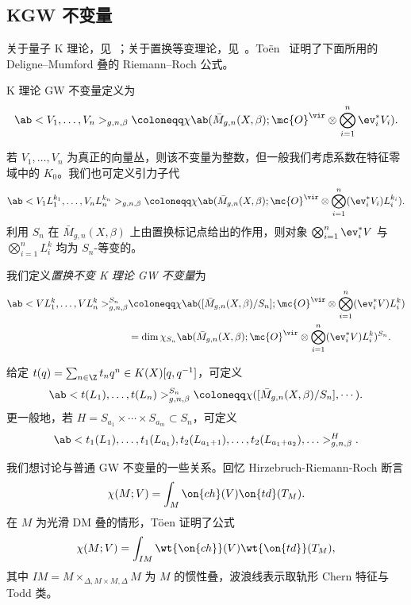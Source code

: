 \subsection{KGW 不变量}%
\label{sub:KGW invariants}

关于量子 K 理论，见~\cite{Lee2004}；关于置换等变理论，见~\cite{Givental2017K1,GiventalK7}。To\"en~\cite{Toen1999} 证明了下面所用的 Deligne--Mumford 叠的 Riemann--Roch 公式。

\begin{defn}
    K 理论 GW 不变量定义为
    \[ \ab<V_1, \ldots, V_n>_{g,n,\beta} \coloneqq \chi\ab(\bar{M}_{g,n}(X, \beta); \mc{O}^{\vir} \otimes \bigotimes_{i=1}^n \ev_i^* V_i). \]
\end{defn}

若 \(V_1, \ldots, V_n\) 为真正的向量丛，则该不变量为整数，但一般我们考虑系数在特征零域中的 \(K_0\)。我们也可定义引力子代
\[ \ab<V_1 L_1^{k_1}, \ldots, V_n L_n^{k_n}>_{g,n,\beta} \coloneqq \chi\ab(\bar{M}_{g,n}(X, \beta); \mc{O}^{\vir} \otimes \bigotimes_{i=1}^n ( \ev_i^* V_i )L_i^{k_i} ). \]
利用 \(S_n\) 在 \(\bar{M}_{g,n}(X, \beta)\) 上由置换标记点给出的作用，则对象 \(\bigotimes_{i=1}^n \ev_i^* V\) 与 \(\bigotimes_{i=1}^n L_i^k\) 均为 \(S_n\)-等变的。

\begin{defn}
    我们定义\textit{置换不变 K 理论 GW 不变量}为
    \begin{align*}
        \ab<V L_1^k, \ldots, V L_n^k>_{g,n,\beta}^{S_n} &\coloneqq \chi\ab([ \bar{M}_{g,n}(X, \beta)/S_n ]; \mc{O}^{\vir} \otimes \bigotimes_{i=1}^n ( \ev_i^* V ) L_i^k) \\
        &= \dim \chi_{S_n} \ab(\bar{M}_{g,n}(X, \beta); \mc{O}^{\vir} \otimes \bigotimes_{i=1}^n ( \ev_i^* V ) L_i^k )^{S_n}.
    \end{align*}
\end{defn}

给定 \(t(q) = \sum_{n \in \Z} t_n q^n \in K(X)[q,q^{-1}]\)，可定义
\[ \ab< t(L_1), \ldots, t(L_n)>^{S_n}_{g,n,\beta} \coloneqq \chi ([\bar{M}_{g,n}(X,\beta)/S_n], \cdots). \]
更一般地，若 \(H = S_{a_1} \times \cdots \times S_{a_m} \subset S_n\)，可定义
\[ \ab<t_1(L_1), \ldots, t_1(L_{a_1}), t_2(L_{a_1+1}), \ldots, t_2(L_{a_1+a_2}), \ldots>_{g,n,\beta}^H. \]

\begin{rmk}
    我们想讨论与普通 GW 不变量的一些关系。回忆 Hirzebruch-Riemann-Roch 断言
    \[ \chi(M; V) = \int_M \on{ch}(V) \on{td}(T_M). \]
    在 \(M\) 为光滑 DM 叠的情形，T\"oen 证明了公式
    \[ \chi(M; V) = \int_{IM} \wt{\on{ch}}(V) \wt{\on{td}}(T_M), \]
    其中 \(IM = M \times_{\Delta, M \times M, \Delta} M\) 为 \(M\) 的惯性叠，波浪线表示取轨形 Chern 特征与 Todd 类。
\end{rmk}

